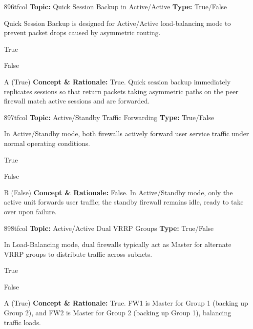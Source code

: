 \begin{qcard}{896}{tfcol}
\textcolor{darkslate!75}{\small\textbf{Topic:} Quick Session Backup in Active/Active \hfill \textbf{Type:} True/False}\vspace{0.4em}\par
Quick Session Backup is designed for Active/Active load-balancing mode to prevent packet drops caused by asymmetric routing.
\begin{qoptions}
\item True
\item False
\end{qoptions}
\end{qcard}
\nopagebreak
\begin{explainbox}{A (True)}
\textbf{Concept \& Rationale:} True. Quick session backup immediately replicates sessions so that return packets taking asymmetric paths on the peer firewall match active sessions and are forwarded.
\end{explainbox}

\begin{qcard}{897}{tfcol}
\textcolor{darkslate!75}{\small\textbf{Topic:} Active/Standby Traffic Forwarding \hfill \textbf{Type:} True/False}\vspace{0.4em}\par
In Active/Standby mode, both firewalls actively forward user service traffic under normal operating conditions.
\begin{qoptions}
\item True
\item False
\end{qoptions}
\end{qcard}
\nopagebreak
\begin{explainbox}{B (False)}
\textbf{Concept \& Rationale:} False. In Active/Standby mode, only the active unit forwards user traffic; the standby firewall remains idle, ready to take over upon failure.
\end{explainbox}

\begin{qcard}{898}{tfcol}
\textcolor{darkslate!75}{\small\textbf{Topic:} Active/Active Dual VRRP Groups \hfill \textbf{Type:} True/False}\vspace{0.4em}\par
In Load-Balancing mode, dual firewalls typically act as Master for alternate VRRP groups to distribute traffic across subnets.
\begin{qoptions}
\item True
\item False
\end{qoptions}
\end{qcard}
\nopagebreak
\begin{explainbox}{A (True)}
\textbf{Concept \& Rationale:} True. FW1 is Master for Group 1 (backing up Group 2), and FW2 is Master for Group 2 (backing up Group 1), balancing traffic loads.
\end{explainbox}

